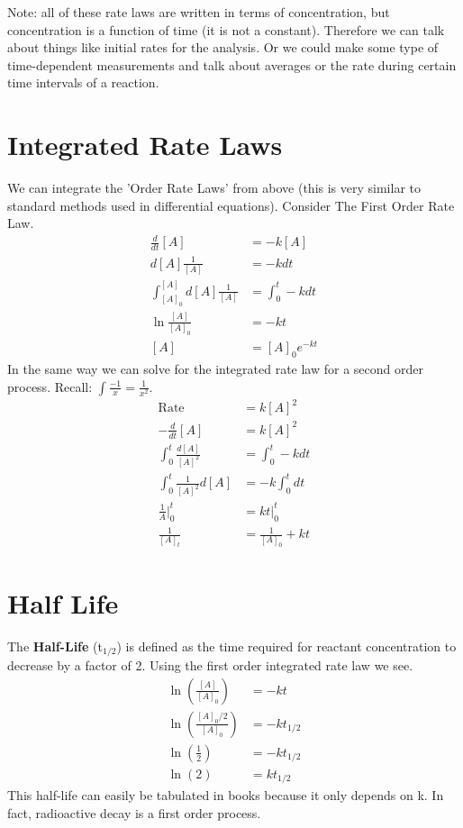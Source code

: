 \documentclass{article}
\newcommand{\be}{\begin{equation}}
\newcommand{\ee}{\end{equation}}
\begin{document}
Note: all of these rate laws are written in terms  of concentration, but concentration is a function of time (it is not  a constant). 
Therefore we can talk about things like initial rates for the analysis.
Or we could make some type of time-dependent measurements and talk about averages or the rate during certain time intervals of a reaction.

\section{Integrated Rate Laws}
We can integrate the 'Order Rate Laws' from above (this is very similar to standard methods used in differential equations). 
Consider The First Order Rate Law.
\be
\begin{split}
\frac{d}{dt}[A] &= -k[A]\\
d[A] \frac{1}{[A]} &= -kdt \\
\int_{[A]_0}^{[A]} d[A] \frac{1}{[A]} &= \int_0^t-kdt \\
\ln \frac{[A]}{[A]_0} &= -kt\\
[A] &= [A]_0 e^{-kt}
\end{split}
\ee
In the same way we can solve for the integrated rate law for a second order process. 
Recall: $\int \frac{-1}{x} = \frac{1}{x^2}$. 
\be
\begin{split}
\text{Rate} &= k[A]^2 \\
-\frac{d}{dt}[A] &= k[A]^2\\
\int_0^t \frac{d[A]}{[A]^2} &= \int_0^t -kdt \\
\int_0^t \frac{1}{[A]^2}d[A] &= -k\int_0^t dt \\
\frac{1}{A}\Bigr|_0^t &= kt\Bigr|_0^t\\
\frac{1}{[A]_t} &= \frac{1}{[A]_0} + kt
\end{split}
\ee

\section{Half Life}
The \textbf{Half-Life} (t$_{1/2}$) is defined as the time required for reactant concentration to decrease by a factor of 2.
Using the first  order integrated rate law we see. 
\be
\begin{split}
\ln\left(\frac{[A]}{[A]_0}\right) &= -kt \\
\ln\left(\frac{[A]_0/2}{[A]_0}\right) &= -kt_{1/2}\\
\ln\left(\frac{1}{2}\right) &= -kt_{1/2}\\
\ln(2) &= kt_{1/2}
\end{split}
\ee
This half-life can easily be tabulated in books because it  only depends on k. 
In fact, radioactive decay is a first order process. 
\end{document}
